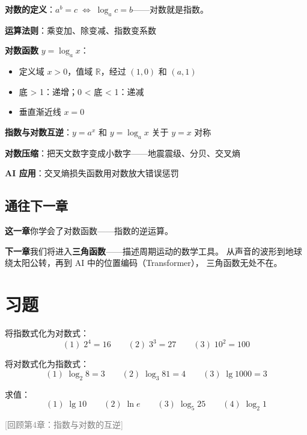 \begin{progressbox}
\textbf{对数的定义}：\(a^b = c \;\Longleftrightarrow\; \log_a c = b\)——对数就是指数。

\textbf{运算法则}：乘变加、除变减、指数变系数

\textbf{对数函数} \(y = \log_a x\)：
\begin{itemize}
  \item 定义域 \(x > 0\)，值域 \(\mathbb{R}\)，经过 \((1,0)\) 和 \((a,1)\)
  \item 底 > 1：递增；0 < 底 < 1：递减
  \item 垂直渐近线 \(x = 0\)
\end{itemize}

\textbf{指数与对数互逆}：\(y = a^x\) 和 \(y = \log_a x\) 关于 \(y = x\) 对称

\textbf{对数压缩}：把天文数字变成小数字——地震震级、分贝、交叉熵

\textbf{AI 应用}：交叉熵损失函数用对数放大错误惩罚
\end{progressbox}

\subsection*{通往下一章}

\textbf{这一章}你学会了对数函数——指数的逆运算。

\textbf{下一章}我们将进入\textbf{三角函数}——描述周期运动的数学工具。
从声音的波形到地球绕太阳公转，再到 AI 中的位置编码（Transformer），
三角函数无处不在。


\section{习题}


\begin{exercise}[0]
将指数式化为对数式：
\[
(1)\; 2^4 = 16 \qquad (2)\; 3^3 = 27 \qquad (3)\; 10^2 = 100
\]
\end{exercise}

\begin{exercise}[0]
将对数式化为指数式：
\[
(1)\; \log_2 8 = 3 \qquad (2)\; \log_3 81 = 4 \qquad (3)\; \lg 1000 = 3
\]
\end{exercise}

\begin{exercise}[0]
求值：
\[
(1)\; \lg 10 \qquad (2)\; \ln e \qquad (3)\; \log_5 25 \qquad (4)\; \log_2 1
\]
\end{exercise}
\qquad \textcolor{gray}{[回顾第4章：指数与对数的互逆]}%

